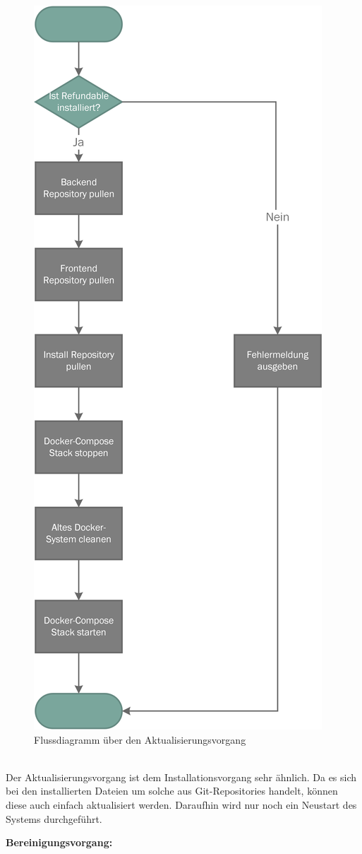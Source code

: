 \begin{figure}[H]
	\centering
	\includegraphics[width=0.47\linewidth]{images/mbeier_konzept/Update}
	\caption[Flussdiagramm über den Aktualisierungsvorgang]{Flussdiagramm über den Aktualisierungsvorgang}
	\label{fig:update}
\end{figure}
~\\
Der Aktualisierungsvorgang ist dem Installationsvorgang sehr ähnlich. Da es sich bei den installierten Dateien um solche aus Git-Repositories handelt, können diese auch einfach aktualisiert werden. Daraufhin wird nur noch ein Neustart des Systems durchgeführt.

\newpage

\textbf{Bereinigungsvorgang:}

